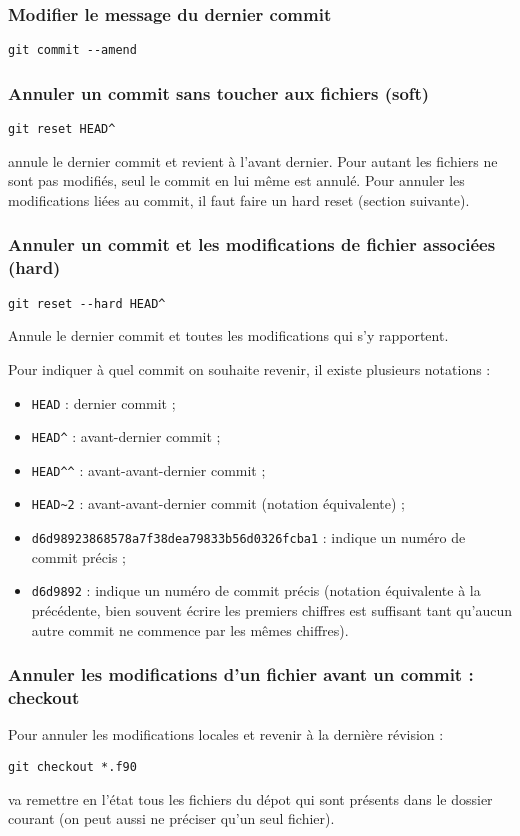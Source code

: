 \documentclass[a4paper,twoside]{article}
\begin{document}
\subsubsection{Modifier le message du dernier commit}
\begin{verbatim}
git commit --amend
\end{verbatim}

\subsubsection{Annuler un commit sans toucher aux fichiers (soft)}
\begin{verbatim}
git reset HEAD^
\end{verbatim}
annule le dernier commit et revient à l'avant dernier. Pour autant les fichiers ne sont pas modifiés, seul le commit en lui même est annulé. Pour annuler les modifications liées au commit, il faut faire un hard reset (section suivante).





\subsubsection{Annuler un commit et les modifications de fichier associées (hard)}
\begin{verbatim}
git reset --hard HEAD^
\end{verbatim}
Annule le dernier commit et toutes les modifications qui s'y rapportent. 

Pour indiquer à quel commit on souhaite revenir, il existe plusieurs notations :
\begin{itemize}
\item \verb|HEAD| : dernier commit ;
\item \verb|HEAD^| : avant-dernier commit ;
\item \verb|HEAD^^| : avant-avant-dernier commit ;
\item \verb|HEAD~2| : avant-avant-dernier commit (notation équivalente) ;
\item \verb|d6d98923868578a7f38dea79833b56d0326fcba1| : indique un numéro de commit précis ;
\item \verb|d6d9892| : indique un numéro de commit précis (notation équivalente à la précédente, bien souvent écrire les premiers chiffres est suffisant tant qu’aucun autre commit ne commence par les mêmes chiffres).
\end{itemize}

\subsubsection{Annuler les modifications d'un fichier avant un commit : checkout}
Pour annuler les modifications locales et revenir à la dernière révision : 
\begin{verbatim}
git checkout *.f90
\end{verbatim}
va remettre en l'état tous les fichiers du dépot qui sont présents dans le dossier courant (on peut aussi ne préciser qu'un seul fichier).
\end{document}
